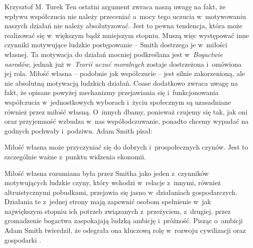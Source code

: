 \begin{artplenv}{Krzysztof M. Turek}
Ten ostatni argument zwraca naszą uwagę na fakt, że wpływu współczucia nie należy przeceniać a~mocy tego
uczucia w~motywowaniu naszych działań nie należy absolutyzować. Jest to pewna tendencja, która może realizować się w~większym
bądź mniejszym stopniu. Muszą więc występować inne czynniki motywujące ludzkie postępowanie -- Smith dostrzega
je w~miłości własnej. Ta motywacja do działań mocniej podkreślana jest w~\textit{Bogactwie
narodów}, jednak już w~\textit{Teorii uczuć moralnych} zostaje dostrzeżona i~omówiona jej rola.
Miłość własna -- podobnie jak współczucie -- jest silnie zakorzenioną, ale nie absolutną motywacją ludzkich działań. Coase
\parencite*[s.~9]{coase_adam_1976}
dodatkowo zwraca uwagę na fakt, że opisane powyżej mechanizmy przejawiania
się i~funkcjonowania współczucia w~jednostkowych wyborach i~życiu społecznym są uzasadniane również przez miłość
własną. O~innych dbamy, ponieważ czujemy się tak, jak oni oraz przyjemność wzbudza w~nas współodczuwanie, ponadto chcemy wypadać
na godnych pochwały i~podziwu. Adam Smith
\parencite*[s.~69]{smith_theory_2005}
pisał: 

Miłość własna może przyczyniać się do dobrych i~prospołecznych czynów. Jest to szczególnie ważne z~punktu widzenia
ekonomii. 


Miłość własna rozumiana była przez Smitha jako jeden z~czynników motywujących ludzkie czyny, który
wchodzi w~relacje z~innymi, również altruistycznymi pobudkami, przejawia się jasno w~działaniach
gospodarczych. Działania te z~jednej
strony mają zapewnić osobom spełnienie w~jak największym stopniu ich potrzeb związanych z~przeżyciem, z~drugiej, przez
gromadzenie bogactwa zaspokajają ludzką ambicję i~próżność. Pisząc o~ambicji Adam Smith twierdził, że odegrała ona
kluczową rolę w~rozwoju cywilizacji oraz gospodarki
\parencite[s.~164]{smith_theory_1969}.


\end{artplenv}

